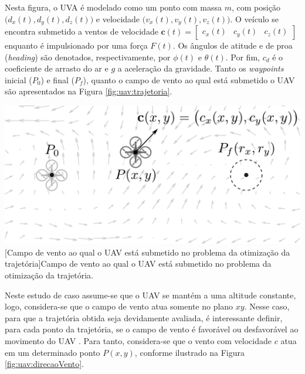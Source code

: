 Nesta figura, o UVA é modelado como um ponto com massa $ m $, com posição $ \big(d_x(t), d_y(t), d_z(t)\big) $ e velocidade $ \big(v_x(t), v_y(t), v_z(t)\big) $. O veículo se encontra submetido a ventos de velocidade $ \mathbf{c}(t) = \begin{bmatrix} c_x(t) & c_y(t) & c_z(t) \end{bmatrix} $ enquanto é impulsionado por uma força $ F(t) $. Os ângulos de atitude e de proa (\textit{heading}) são denotados, respectivamente, por $ \phi(t) $ e $ \theta(t) $. Por fim, $ c_d $ é o coeficiente de arrasto do ar e $ g $ a aceleração da gravidade. Tanto os \textit{waypoints} inicial ($ P_0 $) e final ($ P_f $), quanto o campo de vento ao qual está submetido o UAV são apresentados na Figura \ref{fig:uav:trajetoria}. 

\noindent	
\begin{minipage}{\textwidth}
	\vspace{\onelineskip}
	\centering
	\includegraphics[scale=0.45]{draw/resultados/pdf/uavTraj}
	[Campo de vento ao qual o UAV está submetido no problema  da otimização da trajetória]{Campo de vento ao qual o UAV está submetido no problema  da otimização da trajetória.}
	\label{fig:uav:trajetoria}
	\vspace{\onelineskip}
\end{minipage}

Neste estudo de caso assume-se que o UAV se mantém a uma altitude constante, logo, considera-se que o campo de vento atua somente no plano $ xy $. Nesse caso, para que a trajetória obtida seja devidamente avaliada, é interessante definir, para cada ponto da trajetória, se o campo de vento é favorável ou desfavorável ao movimento do UAV \cite{muppirala_finding_2020, teja_muppirala_finding_2013}. Para tanto, considera-se que o vento com velocidade $ c $ atua em um determinado ponto $ P(x,y) $, conforme ilustrado na Figura \ref{fig:uav:direcaoVento}. 


